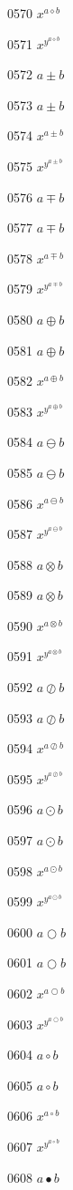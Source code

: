 \documentclass{article}
\begin{document}
0570 $x^{a\diamond b}$\par
0571 $x^{y^{a\diamond b}}$\par
0572 $a\pm b$\par
0573 $\displaystyle a\pm b$\par
0574 $x^{a\pm b}$\par
0575 $x^{y^{a\pm b}}$\par
0576 $a\mp b$\par
0577 $\displaystyle a\mp b$\par
0578 $x^{a\mp b}$\par
0579 $x^{y^{a\mp b}}$\par
0580 $a\oplus b$\par
0581 $\displaystyle a\oplus b$\par
0582 $x^{a\oplus b}$\par
0583 $x^{y^{a\oplus b}}$\par
0584 $a\ominus b$\par
0585 $\displaystyle a\ominus b$\par
0586 $x^{a\ominus b}$\par
0587 $x^{y^{a\ominus b}}$\par
0588 $a\otimes b$\par
0589 $\displaystyle a\otimes b$\par
0590 $x^{a\otimes b}$\par
0591 $x^{y^{a\otimes b}}$\par
0592 $a\oslash b$\par
0593 $\displaystyle a\oslash b$\par
0594 $x^{a\oslash b}$\par
0595 $x^{y^{a\oslash b}}$\par
0596 $a\odot b$\par
0597 $\displaystyle a\odot b$\par
0598 $x^{a\odot b}$\par
0599 $x^{y^{a\odot b}}$\par
0600 $a\bigcirc b$\par
0601 $\displaystyle a\bigcirc b$\par
0602 $x^{a\bigcirc b}$\par
0603 $x^{y^{a\bigcirc b}}$\par
0604 $a\circ b$\par
0605 $\displaystyle a\circ b$\par
0606 $x^{a\circ b}$\par
0607 $x^{y^{a\circ b}}$\par
0608 $a\bullet b$\par
\end{document}
